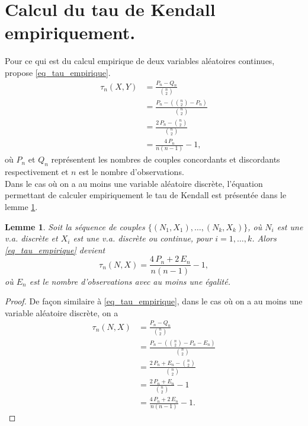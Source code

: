 \documentclass{article}
\newtheorem{lemme}{Lemme}
\begin{document}
	\section{Calcul du tau de Kendall empiriquement.}

	Pour ce qui est du calcul empirique de deux variables aléatoires continues, \cite{Everything} propose \eqref{eq_tau_empirique}.
	\begin{align}
		\tau_n(X,Y)
		&= \frac{P_n - Q_n}{ {n\choose 2} } \nonumber \\
		&=\frac{P_n - ({n\choose 2}-P_n)}{ {n\choose 2} } \nonumber \\
		&=\frac{2 \, P_n - {n\choose 2}}{ {n\choose 2} } \nonumber \\
		&= \frac{4 \, P_n}{n(n-1)} - 1, \label{eq_tau_empirique}
	\end{align}
	où $P_n$ et $Q_n$ représentent les nombres de couples concordants et discordants respectivement et $n$ est le nombre d'observations.\\
	
	Dans le cas où on a au moins une variable aléatoire discrète, l'équation permettant de calculer empiriquement le tau de Kendall est présentée dans le lemme \ref{lemme_empirique}.
	
	\begin{lemme}\label{lemme_empirique}
		 Soit la séquence de couples $\{(N_1, X_1), \dots, (N_k, X_k) \}$, où $N_i$ est une v.a. discrète et $X_i$ est une v.a. discrète ou continue, pour $i=1,\dots,k$. Alors \eqref{eq_tau_empirique} devient 
		\begin{equation}
			\tau_n(N,X) = \frac{4 \, P_n + 2 \, E_n}{n(n-1)} - 1, \label{eq_tau_discret_empirique}
		\end{equation}
		où $E_n$ est le nombre d'observations avec au moins une égalité.
	\end{lemme}
	\begin{proof}
		De façon similaire à \eqref{eq_tau_empirique}, dans le cas où on a au moins une variable aléatoire discrète, on a
		\begin{align}
		\tau_n(N,X) 
		&= \frac{P_n - Q_n}{ {n\choose 2} } \nonumber \\
		&= \frac{P_n - ({n\choose 2} - P_n - E_n)}{ {n\choose 2} } \nonumber \\
		&= \frac{2 \, P_n + E_n - {n\choose 2}}{ {n\choose 2} } \nonumber \\
		&= \frac{2 \, P_n + E_n }{ {n\choose 2} } - 1 \nonumber \\
		&= \frac{4 \, P_n + 2 \, E_n}{n(n-1)} - 1.
		\end{align}
	\end{proof}
\end{document}
